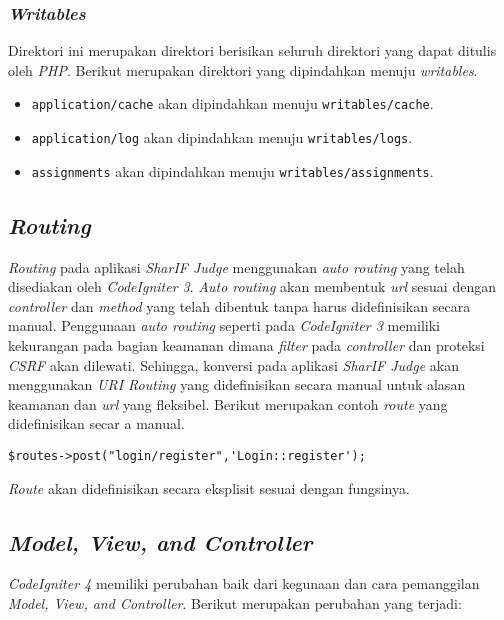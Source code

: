 \subsubsection{\textit{Writables}}
Direktori ini merupakan direktori berisikan seluruh direktori yang dapat ditulis oleh \textit{PHP}. Berikut merupakan direktori yang dipindahkan menuju \textit{writables}.
\begin{itemize}
\item \verb|application/cache| akan dipindahkan menuju \texttt{writables/cache}.
\item \verb|application/log| akan dipindahkan menuju \texttt{writables/logs}.
\item \verb|assignments| akan dipindahkan menuju \texttt{writables/assignments}.
\end{itemize}

\subsection{\textit{Routing}}
\textit{Routing} pada aplikasi \textit{SharIF Judge} menggunakan \textit{auto routing} yang telah disediakan oleh \textit{CodeIgniter 3}. \textit{Auto routing} akan membentuk \textit{url} sesuai dengan \textit{controller} dan \textit{method} yang telah dibentuk tanpa harus didefinisikan secara manual. Penggunaan \textit{auto routing} seperti pada \textit{CodeIgniter 3} memiliki kekurangan pada bagian keamanan dimana \textit{filter} pada \textit{controller} dan proteksi \textit{CSRF} akan dilewati. Sehingga, konversi pada aplikasi \textit{SharIF Judge} akan menggunakan \textit{URI Routing} yang didefinisikan secara manual untuk alasan keamanan dan \textit{url} yang fleksibel. Berikut merupakan contoh \textit{route} yang didefinisikan secar a manual.
\begin{center}
\verb|$routes->post("login/register",'Login::register');|
\end{center}
\textit{Route} akan didefinisikan secara eksplisit sesuai dengan fungsinya.

\subsection{\textit{Model, View, and Controller}}
\textit{CodeIgniter 4} memiliki perubahan baik dari kegunaan dan cara pemanggilan \textit{Model, View, and Controller}. Berikut merupakan perubahan yang terjadi:
